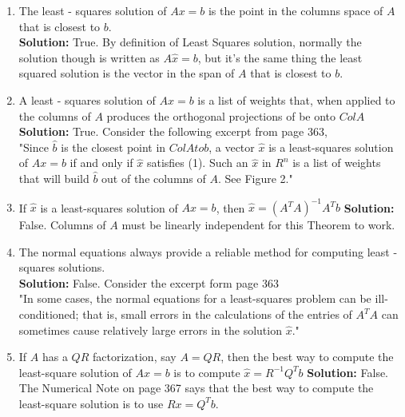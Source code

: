\documentclass{amsart}
\begin{document}
\begin{enumerate}
\begin{enumerate}
\item The least - squares solution of $Ax = b$ is the point in the columns space of $A$ that is closest to $b$.\\
\textbf{Solution: }True. By definition of Least Squares solution, normally the solution though is written as $A\hat{x} = b$, but it's the same thing the least squared solution is the vector in the span of $A$ that is closest to $b$.
\vspace{1in}


\item A least - squares solution of $Ax = b$ is a list of weights that, when applied to the columns of $A$ produces the orthogonal projections of be onto $Col A$\\
\textbf{Solution: }True. Consider the following excerpt from page 363,\\
"Since $\hat{b}$ is the closest point in $Col A to b$, a vector $\hat{x}$ is a least-squares solution of $Ax = b$ if and only if $\hat{x}$ satisfies (1). Such an $\hat{x}$ in $R^n$ is a list of weights that will build $\hat{b}$ out of the columns of $A.$ See Figure 2."
\vspace{1in}


\item If $\hat{x}$ is a least-squares solution of $Ax = b$, then $\hat{x} = (A^TA)^{-1}A^Tb$
\textbf{Solution: }False. Columns of $A$ must be linearly independent for this Theorem to work.
\vspace{1in}


\item The normal equations always provide a reliable method for computing least - squares solutions.\\
\textbf{Solution: }False. Consider the excerpt form page 363\\
"In some cases, the normal equations for a least-squares problem can be ill- conditioned; that is, small errors in the calculations of the entries of $A^TA$ can sometimes cause relatively large errors in the solution $\hat{x}$."
\vspace{1in}



\item If $A$ has a $QR$ factorization, say $A = QR$, then the best way to compute the least-square solution of $Ax = b$ is to compute $\hat{x} = R^{-1}Q^Tb$
\textbf{Solution: } False. The Numerical Note on page 367 says that the best way to compute the least-square solution is to use $Rx = Q^Tb$.
\vspace{1in}





\end{enumerate}
\end{enumerate}
\end{document}
